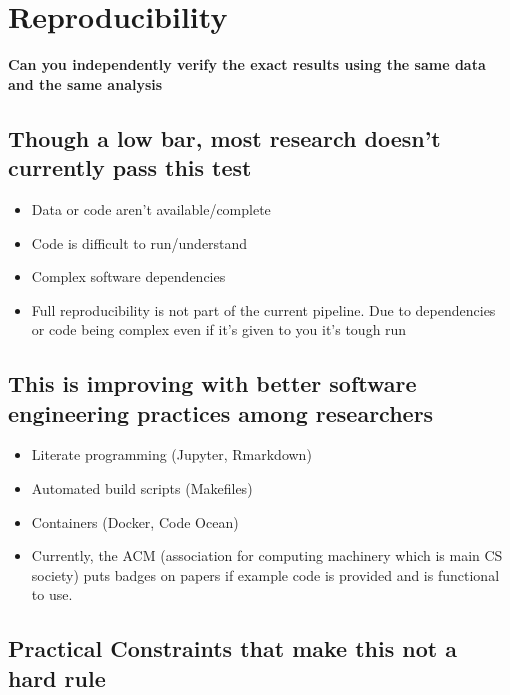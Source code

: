 \section{Reproducibility}
\textbf{Can you independently verify the exact results using the same data and the same analysis}

\subsection{Though a low bar, most research doesn’t currently pass this test}

\begin{itemize}
    \item{Data or code aren’t available/complete}
    
    \item Code is difficult to run/understand
    
    \item Complex software dependencies
    
    \item Full reproducibility is not part of the current pipeline. Due to dependencies or code being complex even if it’s given to you it’s tough run
    
\end{itemize}

\subsection{This is improving with better software engineering practices among researchers}

\begin{itemize}
    \item{Literate programming (Jupyter, Rmarkdown)}
    
    \item Automated build scripts (Makefiles) 
    
    \item Containers (Docker, Code Ocean)
    
    \item Currently, the ACM (association for computing machinery which is main CS society) puts badges on papers if example code is provided and is functional to use.
    
\end{itemize}

\subsection{Practical Constraints that make this not a hard rule}

